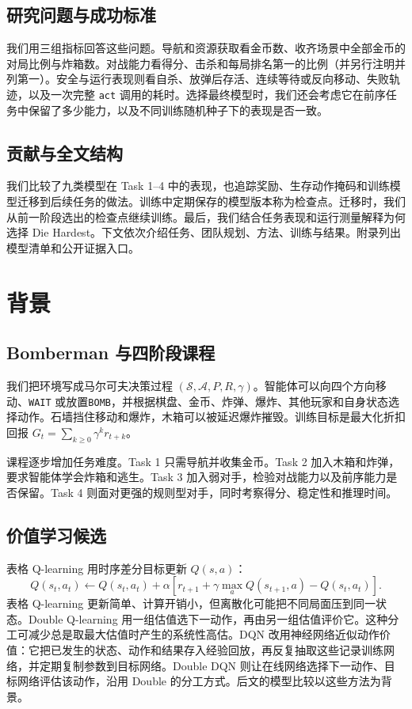 \documentclass[UTF8,11pt,a4paper,fontset=none]{ctexart}
\begin{document}
\subsection{研究问题与成功标准}
我们用三组指标回答这些问题。导航和资源获取看金币数、收齐场景中全部金币的对局比例与炸箱数。对战能力看得分、击杀和每局排名第一的比例（并另行注明并列第一）。安全与运行表现则看自杀、放弹后存活、连续等待或反向移动、失败轨迹，以及一次完整 \texttt{act} 调用的耗时。选择最终模型时，我们还会考虑它在前序任务中保留了多少能力，以及不同训练随机种子下的表现是否一致。

\subsection{贡献与全文结构}
我们比较了九类模型在 Task 1--4 中的表现，也追踪奖励、生存动作掩码和训练模型迁移到后续任务的做法。训练中定期保存的模型版本称为检查点。迁移时，我们从前一阶段选出的检查点继续训练。最后，我们结合任务表现和运行测量解释为何选择 Die Hardest。下文依次介绍任务、团队规划、方法、训练与结果。附录列出模型清单和公开证据入口。

\section{背景}
\subsection{Bomberman 与四阶段课程}
我们把环境写成马尔可夫决策过程 $(\mathcal S,\mathcal A,P,R,\gamma)$。智能体可以向四个方向移动、\texttt{WAIT} 或放置\texttt{BOMB}，并根据棋盘、金币、炸弹、爆炸、其他玩家和自身状态选择动作。石墙挡住移动和爆炸，木箱可以被延迟爆炸摧毁。训练目标是最大化折扣回报 $G_t=\sum_{k\ge0}\gamma^k r_{t+k}$。

课程逐步增加任务难度。Task 1 只需导航并收集金币。Task 2 加入木箱和炸弹，要求智能体学会炸箱和逃生。Task 3 加入弱对手，检验对战能力以及前序能力是否保留。Task 4 则面对更强的规则型对手，同时考察得分、稳定性和推理时间。

\subsection{价值学习候选}
表格 Q-learning 用时序差分目标更新 $Q(s,a)$：
\begin{equation}
Q(s_t,a_t)\leftarrow Q(s_t,a_t)+\alpha\left[r_{t+1}+\gamma\max_a Q(s_{t+1},a)-Q(s_t,a_t)\right].
\end{equation}
表格 Q-learning 更新简单、计算开销小，但离散化可能把不同局面压到同一状态。Double Q-learning 用一组估值选下一动作，再由另一组估值评价它。这种分工可减少总是取最大估值时产生的系统性高估\citep{hasselt2010doubleq,vanhasselt2016double}。DQN 改用神经网络近似动作价值：它把已发生的状态、动作和结果存入经验回放，再反复抽取这些记录训练网络，并定期复制参数到目标网络\citep{mnih2015human}。Double DQN 则让在线网络选择下一动作、目标网络评估该动作，沿用 Double 的分工方式\citep{vanhasselt2016double}。后文的模型比较以这些方法为背景。
\end{document}
